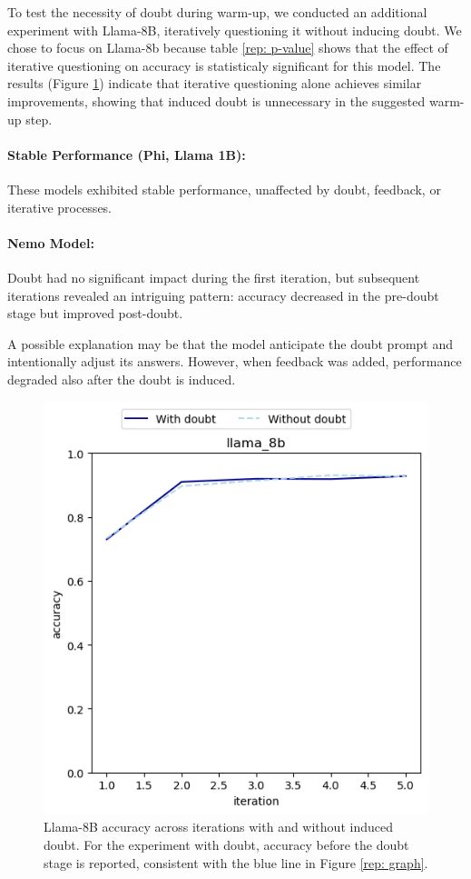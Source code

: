 To test the necessity of doubt during warm-up, we conducted an additional experiment with Llama-8B, iteratively questioning it without inducing doubt. We chose to focus on Llama-8b because table \ref{rep: p-value} shows that the effect of iterative questioning on accuracy is statisticaly significant for this model. The results (Figure \ref{rep: graph_8b}) indicate that iterative questioning alone achieves similar improvements, showing that induced doubt is unnecessary in the suggested warm-up step.

\paragraph{Stable Performance (Phi, Llama 1B):}
These models exhibited stable performance, unaffected by doubt, feedback, or iterative processes.

\paragraph{Nemo Model:}
Doubt had no significant impact during the first iteration, but subsequent iterations revealed an intriguing pattern: accuracy decreased in the pre-doubt stage but improved post-doubt.

A possible explanation may be that the model anticipate the doubt prompt and intentionally adjust its answers. However, when feedback was added, performance degraded also after the doubt is induced.

\begin{figure}[ht!]
  \centering
  \includegraphics[width=0.7\columnwidth]{img/llama_8b_graph.png} %
  \caption{Llama-8B accuracy across iterations with and without induced doubt. For the experiment with doubt, accuracy before the doubt stage is reported, consistent with the blue line in Figure \ref{rep: graph}.}
  \label{rep: graph_8b}
\end{figure}

